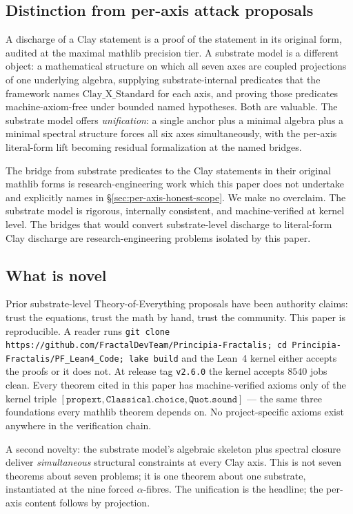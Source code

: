 \documentclass[11pt,a4paper,reqno]{amsart}
\theoremstyle{plain}
\theoremstyle{definition}
\theoremstyle{remark}
\newcommand{\Cstd}[1]{\mathrm{Clay\_#1\_Standard}}
\newcommand{\code}[1]{\texttt{#1}}
\begin{document}
\subsection{Distinction from per-axis attack proposals}
\label{subsec:not-per-axis}

A discharge of a Clay statement is a proof of the statement in its
original form, audited at the maximal mathlib precision tier. A
substrate model is a different object: a mathematical structure on
which all seven axes are coupled projections of one underlying
algebra, supplying substrate-internal predicates that the framework
names $\Cstd{X}$ for each axis, and proving those predicates
machine-axiom-free under bounded named hypotheses. Both are valuable.
The substrate model offers \emph{unification}: a single anchor plus a
minimal algebra plus a minimal spectral structure forces all six axes
simultaneously, with the per-axis literal-form lift becoming
residual formalization at the named bridges.

The bridge from substrate predicates to the Clay statements in their
original mathlib forms is research-engineering work which this paper
does not undertake and explicitly names in
\S\ref{sec:per-axis-honest-scope}. We make no overclaim. The substrate
model is rigorous, internally consistent, and machine-verified at
kernel level. The bridges that would convert substrate-level
discharge to literal-form Clay discharge are research-engineering
problems isolated by this paper.

\subsection{What is novel}
\label{subsec:what-is-novel}

Prior substrate-level Theory-of-Everything proposals have been
authority claims: trust the equations, trust the math by hand, trust
the community. This paper is reproducible. A reader runs
\code{git clone https://github.com/FractalDevTeam/Principia-Fractalis;
cd Principia-Fractalis/PF\_Lean4\_Code; lake build} and the Lean~4
kernel either accepts the proofs or it does not. At release tag
\code{v2.6.0} the kernel accepts $8540$ jobs clean. Every theorem
cited in this paper has machine-verified axioms only of the kernel
triple $[\code{propext},\code{Classical.choice},\code{Quot.sound}]$
--- the same three foundations every mathlib theorem depends on. No
project-specific axioms exist anywhere in the verification chain.

A second novelty: the substrate model's algebraic skeleton plus
spectral closure deliver \emph{simultaneous} structural constraints at
every Clay axis. This is not seven theorems about seven problems; it
is one theorem about one substrate, instantiated at the nine forced
$\alpha$-fibres. The unification is the headline; the per-axis content
follows by projection.
\end{document}
